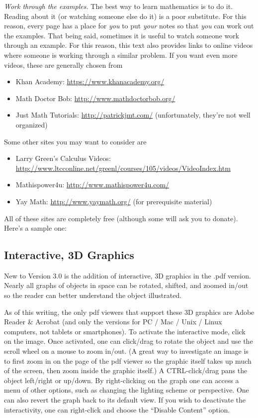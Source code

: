 \textit{Work through the examples.}  The best way to learn mathematics is to do it.  Reading about it (or watching someone else do it) is a poor substitute.  For this reason, every page has a place for \textit{you} to put \textit{your} notes so that \textit{you} can work out the examples.  That being said, sometimes it is useful to watch someone work through an example.  For this reason, this text also provides links to online videos where someone is working through a similar problem.  If you want even more videos, these are generally chosen from
\iflatexml\begin{itemize}\else\begin{itemize}[nosep]\fi
\item Khan Academy: \url{https://www.khanacademy.org/}
\item Math Doctor Bob: \url{http://www.mathdoctorbob.org/}
\item Just Math Tutorials: \url{http://patrickjmt.com/} (unfortunately, they're not well organized)
\end{itemize}
Some other sites you may want to consider are
\iflatexml\begin{itemize}\else\begin{itemize}[nosep]\fi
\item Larry Green's Calculus Videos: \url{http://www.ltcconline.net/greenl/courses/105/videos/VideoIndex.htm}
\item Mathispower4u: \url{http://www.mathispower4u.com/}
\item Yay Math: \url{http://www.yaymath.org/} (for prerequisite material)
\end{itemize}
All of these sites are completely free (although some will ask you to donate).  Here's a sample one:


\subsection*{Interactive, 3D Graphics}

New to Version 3.0 is the addition of interactive, 3D graphics in the .pdf version. Nearly all graphs of objects in space can be rotated, shifted, and zoomed in/out so the reader can better understand the object illustrated. 

As of this writing, the only pdf viewers that support these 3D graphics are Adobe Reader \& Acrobat (and only the versions for PC / Mac / Unix / Linux computers, not tablets or smartphones). To activate the interactive mode, click on the image. Once activated, one can click/drag to rotate the object and use the scroll wheel on a mouse to zoom in/out. (A great way to investigate an image is to first zoom in on the page of the pdf viewer so the graphic itself takes up much of the screen, then zoom inside the graphic itself.) A CTRL-click/drag pans the object left/right or up/down. By right-clicking on the graph one can access a menu of other options, such as changing the lighting scheme or perspective. One can also revert the graph back to its default view. If you wish to deactivate the interactivity, one can right-click and choose the ``Disable Content'' option.


\end{itemize}
\end{itemize}
